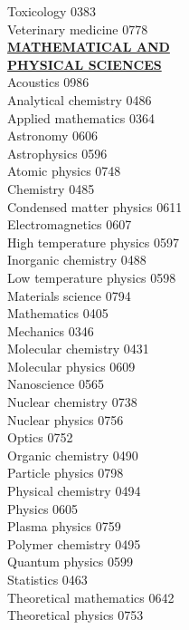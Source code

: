 \documentclass[9pt,twoside]{article}
\newcommand{\categoryheading}[1]{{\fontsize{8}{11}\selectfont \textbf{\uline{#1}}}}
\begin{document}
\begin{multicols}{3}
Toxicology \hfill 0383 \leavevmode \\
Veterinary medicine \hfill 0778 \leavevmode \\
\clearpage
\categoryheading{MATHEMATICAL AND \leavevmode \\
PHYSICAL SCIENCES} \leavevmode \\
Acoustics \hfill 0986 \leavevmode \\
Analytical chemistry \hfill 0486 \leavevmode \\
Applied mathematics \hfill 0364 \leavevmode \\
Astronomy \hfill 0606 \leavevmode \\
Astrophysics \hfill 0596 \leavevmode \\
Atomic physics \hfill 0748 \leavevmode \\
Chemistry \hfill 0485 \leavevmode \\
Condensed matter physics \hfill 0611 \leavevmode \\
Electromagnetics \hfill 0607 \leavevmode \\
High temperature physics \hfill 0597 \leavevmode \\
Inorganic chemistry \hfill 0488 \leavevmode \\
Low temperature physics \hfill 0598 \leavevmode \\
Materials science \hfill 0794 \leavevmode \\
Mathematics \hfill 0405 \leavevmode \\
Mechanics \hfill 0346 \leavevmode \\
Molecular chemistry \hfill 0431 \leavevmode \\
Molecular physics \hfill 0609 \leavevmode \\
Nanoscience \hfill 0565 \leavevmode \\
Nuclear chemistry \hfill 0738 \leavevmode \\
Nuclear physics \hfill 0756 \leavevmode \\
Optics \hfill 0752 \leavevmode \\
Organic chemistry \hfill 0490 \leavevmode \\
Particle physics \hfill 0798 \leavevmode \\
Physical chemistry \hfill 0494 \leavevmode \\
Physics \hfill 0605 \leavevmode \\
Plasma physics \hfill 0759 \leavevmode \\
Polymer chemistry \hfill 0495 \leavevmode \\
Quantum physics \hfill 0599 \leavevmode \\
Statistics \hfill 0463 \leavevmode \\
Theoretical mathematics \hfill 0642 \leavevmode \\
Theoretical physics \hfill 0753 \leavevmode \\
\columnbreak
\columnbreak
\end{multicols}
\end{document}

